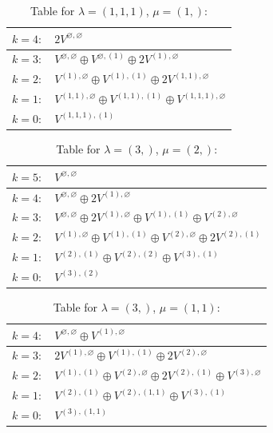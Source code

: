 \renewcommand{\arraystretch}{1.6} 
\begin{table}[H]
\centering
\caption{Table for $\lambda = (1, 1, 1)$, $\mu = (1,)$:}
\begin{tabular}{|>{\centering\arraybackslash}p{15cm}|}
\hline
 $k = 4: \quad 2 V^{\varnothing, \varnothing} $ \\ \hline
 $k = 3: \quad V^{\varnothing, \varnothing} \oplus V^{\varnothing, (1)} \oplus 2 V^{(1), \varnothing} $ \\ \hline
 $k = 2: \quad V^{(1), \varnothing} \oplus V^{(1), (1)} \oplus 2 V^{(1, 1), \varnothing} $ \\ \hline
 $k = 1: \quad V^{(1, 1), \varnothing} \oplus V^{(1, 1), (1)} \oplus V^{(1, 1, 1), \varnothing} $ \\ \hline
 $k = 0: \quad V^{(1, 1, 1), (1)} $ \\ \hline
\end{tabular}
\end{table}

\renewcommand{\arraystretch}{1.6} 
\begin{table}[H]
\centering
\caption{Table for $\lambda = (3,)$, $\mu = (2,)$:}
\begin{tabular}{|>{\centering\arraybackslash}p{15cm}|}
\hline
 $k = 5: \quad V^{\varnothing, \varnothing} $ \\ \hline
 $k = 4: \quad V^{\varnothing, \varnothing} \oplus 2 V^{(1), \varnothing} $ \\ \hline
 $k = 3: \quad V^{\varnothing, \varnothing} \oplus 2 V^{(1), \varnothing} \oplus V^{(1), (1)} \oplus V^{(2), \varnothing} $ \\ \hline
 $k = 2: \quad V^{(1), \varnothing} \oplus V^{(1), (1)} \oplus V^{(2), \varnothing} \oplus 2 V^{(2), (1)} $ \\ \hline
 $k = 1: \quad V^{(2), (1)} \oplus V^{(2), (2)} \oplus V^{(3), (1)} $ \\ \hline
 $k = 0: \quad V^{(3), (2)} $ \\ \hline
\end{tabular}
\end{table}

\renewcommand{\arraystretch}{1.6} 
\begin{table}[H]
\centering
\caption{Table for $\lambda = (3,)$, $\mu = (1, 1)$:}
\begin{tabular}{|>{\centering\arraybackslash}p{15cm}|}
\hline
 $k = 4: \quad V^{\varnothing, \varnothing} \oplus V^{(1), \varnothing} $ \\ \hline
 $k = 3: \quad 2 V^{(1), \varnothing} \oplus V^{(1), (1)} \oplus 2 V^{(2), \varnothing} $ \\ \hline
 $k = 2: \quad V^{(1), (1)} \oplus V^{(2), \varnothing} \oplus 2 V^{(2), (1)} \oplus V^{(3), \varnothing} $ \\ \hline
 $k = 1: \quad V^{(2), (1)} \oplus V^{(2), (1, 1)} \oplus V^{(3), (1)} $ \\ \hline
 $k = 0: \quad V^{(3), (1, 1)} $ \\ \hline
\end{tabular}
\end{table}

